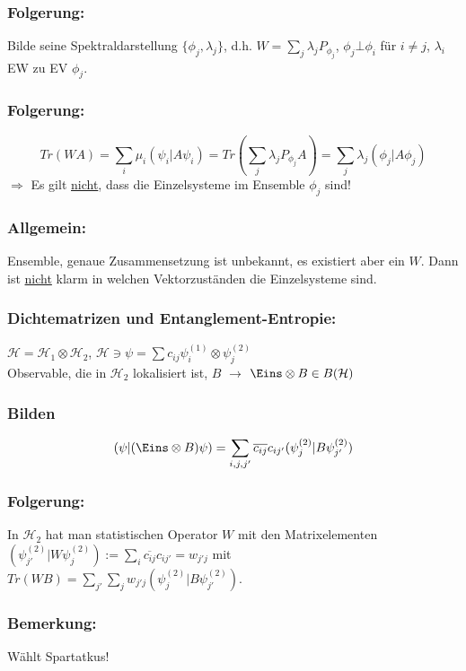 \documentclass[twoside,a4paper]{scrartcl}
\renewcommand{\1}{\mathds{1}}
\newcommand{\Ra}{\Rightarrow}
\newcommand{\ra}{\rightarrow}
\renewcommand{\l}{\lambda}
\renewcommand{\H}{\mathcal{H}}
\begin{document}
\subsubsection*{Folgerung:} 
Bilde seine Spektraldarstellung $\{\phi_j,\l_j\}$, d.h. $W=\sum_j \l_j P_{\phi_j}$, $\phi_j \bot \phi_i$ für $i\neq j$, $\l_i$ EW zu EV $\phi_j$.
\subsubsection*{Folgerung:} 
$$Tr(WA)=\sum_i \mu_i (\psi_i|A\psi_i)=Tr(\sum_j \l_j P_{\phi_j}A)=\sum_j \l_j (\phi_j|A\phi_j)$$
$\Ra$ Es gilt \underline{nicht}, dass die Einzelsysteme im Ensemble $\phi_j$ sind!
\subsubsection*{Allgemein:} 
Ensemble, genaue Zusammensetzung ist unbekannt, es existiert aber ein $W$. Dann ist \underline{nicht} klarm in welchen Vektorzuständen die Einzelsysteme sind.

\subsubsection*{Dichtematrizen und Entanglement-Entropie:} 
$\H=\H_1 \otimes \H_2$, $\H \ni \psi=\sum c_{ij} \psi_i^{(1)}\otimes \psi_j^{(2)}$\\
Observable, die in $\H_2$ lokalisiert ist, $B$ $\ra$ $\Eins \otimes B \in B(\H)$
\subsubsection*{Bilden} 
$$(\psi|(\Eins \otimes B)\psi)=\sum_{i,j,j'} \overline{c_{ij}}c_{ij'}(\psi_j^{(2)}|B\psi_{j'}^{(2)})$$
\subsubsection*{Folgerung:} 
In $\H_2$ hat man statistischen Operator $W$ mit den Matrixelementen $(\psi_{j'}^{(2)}|W\psi_{j}^{(2)}):=\sum_i \overline{c_{ij}}c_{ij'}=w_{j'j}$ mit $Tr(WB)=\sum_{j'} \sum_j w_{j'j}(\psi_{j}^{(2)}|B\psi_{j'}^{(2)})$.
\subsubsection*{Bemerkung:} 
Wählt Spartatkus!
\end{document}

